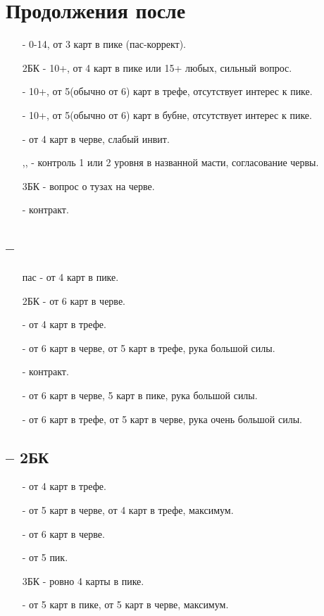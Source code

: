 \documentclass{article}
\begin{document}
\section{Продолжения после }
\begin{enumerate}
    \item[\sp{2}] - 0-14, от 3 карт в пике (пас-коррект).
    \item[2БК] - 10+, от 4 карт в пике или 15+ любых, сильный вопрос.
     \item[\cl{3}] - 10+, от 5(обычно от 6) карт в трефе, отсутствует интерес к пике. 
    \item[\di{3}] - 10+, от 5(обычно от 6) карт в бубне, отсутствует интерес к пике. 
    \item[\he{3}] - от 4 карт в черве, слабый инвит.
    \item[\sp{3},\cl{4}, \di{4}] - контроль 1 или 2 уровня в названной масти, согласование червы.
    \item[3БК] - вопрос о тузах на черве.
    \item[\he{4}] - контракт.
\end{enumerate}
\subsection{ -- }
\begin{enumerate}
    \item[пас] - от 4 карт в пике.
    \item[2БК] - от 6 карт в черве.
    \item[\cl{3}] - от 4 карт в трефе.
    \item[\di{3}] - от 6 карт в черве, от 5 карт в трефе, рука большой силы.
    \item[\he{3}] - контракт.
    \item[\sp{3}] - от 6 карт в черве, 5 карт в пике, рука большой силы.
    \item[\cl{4}] - от 6 карт в трефе, от 5 карт в черве, рука очень большой силы.
\end{enumerate}
\subsection{ -- 2БК}
\begin{enumerate}
    \item[\cl{3}] - от 4 карт в трефе.
    \item[\di{3}] - от 5 карт в черве, от 4 карт в трефе, максимум.
    \item[\he{3}] - от 6 карт в черве.
    \item[\sp{3}] - от 5 пик.
    \item[3БК] - ровно 4 карты в пике.
    \item[\he{4}] - от 5 карт в пике, от 5 карт в черве, максимум.
\end{enumerate}
\end{document}
